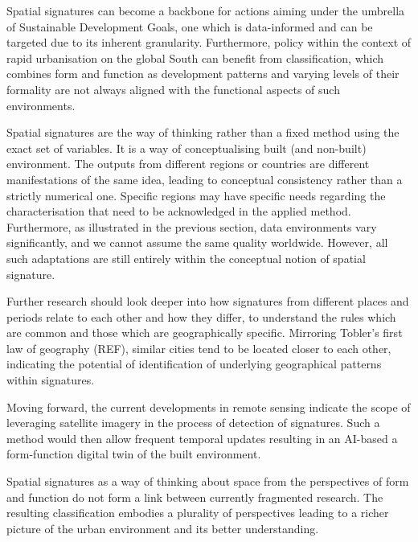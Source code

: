 Spatial signatures can become a backbone for actions aiming under the umbrella of
Sustainable Development Goals, one which is data-informed and can be targeted
due to its inherent granularity. Furthermore, policy within the context of rapid
urbanisation on the global South can benefit from classification, which combines
form and function as development patterns and varying levels of their formality
are not always aligned with the functional aspects of such environments.

Spatial signatures are the way of thinking rather than a fixed method using the
exact set of variables. It is a way of conceptualising built (and non-built)
environment. The outputs from different regions or countries are different
manifestations of the same idea, leading to conceptual consistency rather than
a strictly numerical one. Specific regions may have specific needs regarding the
characterisation that need to be acknowledged in the applied method. Furthermore,
as illustrated in the previous section, data environments vary significantly, and
we cannot assume the same quality worldwide. However, all such
adaptations are still entirely within the conceptual notion of spatial signature.

Further research should look deeper into how signatures from different places
and periods relate to each other and how they differ, to understand the
rules which are common and those which are geographically specific. Mirroring
Tobler's first law of geography (REF), similar cities tend to be located closer
to each other, indicating the potential of identification of underlying
geographical patterns within signatures.

Moving forward, the current developments in remote sensing indicate the scope of
leveraging satellite imagery in the process of detection of signatures. Such a
method would then allow frequent temporal updates resulting in an AI-based
a form-function digital twin of the built environment.

Spatial signatures as a way of thinking about space from the perspectives of
form and function do not form a link between currently fragmented research.
The resulting classification embodies a plurality of perspectives leading to a
richer picture of the urban environment and its better understanding.
